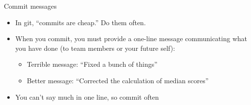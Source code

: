 \documentclass[aspectratio=169,11pt,t]{beamer}
\begin{document}
\begin{frame}{Commit messages}
  \vskip3mm
  \begin{itemize}
    \item In git, ``commits are cheap.'' Do them often.
    \item When you commit, you must provide a one-line message communicating what you have
          done (to team members or your future self):
      \begin{itemize}
        \item Terrible message: ``Fixed a bunch of things''
        \item Better message: ``Corrected the calculation of median scores''
      \end{itemize}
    \item You can't say much in one line, so commit often
  \end{itemize}
\end{frame}
\end{document}
